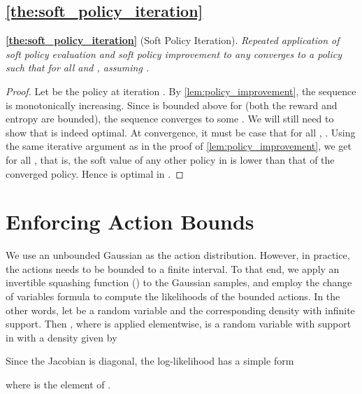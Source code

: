 \documentclass{article}
\begin{document}
\subsection{\autoref{the:soft_policy_iteration}}
\label{app:the_soft_policy_iteration}







\textbf{\autoref{the:soft_policy_iteration}} (Soft Policy Iteration). \textit{
Repeated application of soft policy evaluation and soft policy improvement to any  converges to a policy  such that  for all  and , assuming .}
\begin{proof}
Let  be the policy at iteration . By \autoref{lem:policy_improvement}, the sequence  is monotonically increasing. Since  is bounded above for  (both the reward and entropy are bounded), the sequence converges to some . We will still need to show that  is indeed optimal. At convergence, it must be case that  for all , . Using the same iterative argument as in the proof of \autoref{lem:policy_improvement}, we get  for all , that is, the soft value of any other policy in  is lower than that of the converged policy. Hence  is optimal in .
\end{proof}




\section{Enforcing Action Bounds}
\label{app:action_bounds}


We use an unbounded Gaussian as the action distribution. However, in practice, the actions needs to be bounded to a finite interval. To that end, we
apply an invertible squashing function 
() to the Gaussian samples, and employ the change of variables formula to compute the likelihoods of the bounded actions. In the other words, let  be a random variable and  the corresponding density with infinite support. Then , where  is applied elementwise, is a random variable with support in  with a density given by

Since the Jacobian  is diagonal, the log-likelihood has a simple form 

where  is the  element of .
\end{document}
